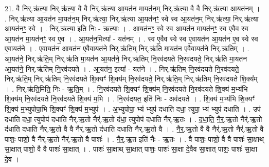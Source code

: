 \documentclass[17pt]{extarticle}
\begin{document}
21. वै निर्.ऋ॑त्या॒ निर्.ऋ॑त्या॒ वै वै निर्.ऋ॑त्या आ॒यत॑न मा॒यत॑न॒म् निर्.ऋ॑त्या॒ वै वै निर्.ऋ॑त्या आ॒यत॑नम् । . निर्.ऋ॑त्या आ॒यत॑न मा॒यत॑न॒म् निर्.ऋ॑त्या॒ निर्.ऋ॑त्या आ॒यत॑नꣳ॒॒ स्वे स्व आ॒यत॑न॒म् निर्.ऋ॑त्या॒ निर्.ऋ॑त्या आ॒यत॑नꣳ॒॒ स्वे । . निर्.ऋ॑त्या॒ इति॒ निः - ऋ॒त्याः॒ । . आ॒यत॑नꣳ॒॒ स्वे स्व आ॒यत॑न मा॒यत॑नꣳ॒॒ स्व ए॒वैव स्व आ॒यत॑न मा॒यत॑नꣳ॒॒ स्व ए॒व । . आ॒यत॑न॒मित्या᳚ - यत॑नम् । . स्व ए॒वैव स्वे स्व ए॒वायत॑न आ॒यत॑न ए॒व स्वे स्व ए॒वायत॑ने । . ए॒वायत॑न आ॒यत॑न ए॒वैवायत॑ने॒ निर्.ऋ॑ति॒म् निर्.ऋ॑ति मा॒यत॑न ए॒वैवायत॑ने॒ निर्.ऋ॑तिम् । . आ॒यत॑ने॒ निर्.ऋ॑ति॒म् निर्.ऋ॑ति मा॒यत॑न आ॒यत॑ने॒ निर्.ऋ॑तिम् नि॒रव॑दयते नि॒रव॑दयते॒ निर्.ऋ॑ति मा॒यत॑न आ॒यत॑ने॒ निर्.ऋ॑तिम् नि॒रव॑दयते । . आ॒यत॑न॒ इत्या᳚ - यत॑ने । . निर्.ऋ॑तिम् नि॒रव॑दयते नि॒रव॑दयते॒ निर्.ऋ॑ति॒म् निर्.ऋ॑तिम् नि॒रव॑दयते शि॒क्यꣳ॑ शि॒क्य॑म् नि॒रव॑दयते॒ निर्.ऋ॑ति॒म् निर्.ऋ॑तिम् नि॒रव॑दयते शि॒क्य᳚म् । . निर्.ऋ॑ति॒मिति॒ निः - ऋ॒ति॒म् । . नि॒रव॑दयते शि॒क्यꣳ॑ शि॒क्य॑म् नि॒रव॑दयते नि॒रव॑दयते शि॒क्य॑ म॒भ्य॑भि शि॒क्य॑म् नि॒रव॑दयते नि॒रव॑दयते शि॒क्य॑ म॒भि । . नि॒रव॑दयत॒ इति॑ निः - अव॑दयते । . शि॒क्य॑ म॒भ्य॑भि शि॒क्यꣳ॑ शि॒क्य॑ म॒भ्युपोपा॒भि शि॒क्यꣳ॑ शि॒क्य॑ म॒भ्युप॑ । . अ॒भ्युपोपा॒ भ्य॑ भ्युप॑ दधाति दधा॒ त्युपा॒ भ्य॑ भ्युप॑ दधाति । . उप॑ दधाति दधा॒ त्युपोप॑ दधाति नैर्.ऋ॒तो नैर्॑.ऋ॒तो द॑धा॒ त्युपोप॑ दधाति नैर्.ऋ॒तः । . द॒धा॒ति॒ नै॒र्॒.ऋ॒तो नैर्॑.ऋ॒तो द॑धाति दधाति नैर्.ऋ॒तो वै वै नैर्॑.ऋ॒तो द॑धाति दधाति नैर्.ऋ॒तो वै । . नै॒र्॒.ऋ॒तो वै वै नैर्॑.ऋ॒तो नैर्॑.ऋ॒तो वै पाशः॒ पाशो॒ वै नैर्॑.ऋ॒तो नैर्॑.ऋ॒तो वै पाशः॑ । . नै॒र्॒.ऋ॒त इति॑ नैः - ऋ॒तः । . वै पाशः॒ पाशो॒ वै वै पाशः॑ सा॒क्षाथ् सा॒क्षात् पाशो॒ वै वै पाशः॑ सा॒क्षात् । . पाशः॑ सा॒क्षाथ् सा॒क्षात् पाशः॒ पाशः॑ सा॒क्षा दे॒वैव सा॒क्षात् पाशः॒ पाशः॑ सा॒क्षा दे॒व । \newline
\end{document}
